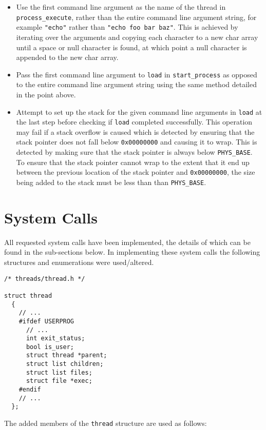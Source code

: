 \documentclass{article}
\begin{document}
\begin{itemize}
    \item Use the first command line argument as the name of the thread in \verb!process_execute!, rather than the entire command line argument string, for example \verb!"echo"! rather than \verb!"echo foo bar baz"!. This is achieved by iterating over the arguments and copying each character to a new char array until a space or null character is found, at which point a null character is appended to the new char array.

    \item Pass the first command line argument to \verb!load! in \verb!start_process! as opposed to the entire command line argument string using the same method detailed in the point above.

    \item Attempt to set up the stack for the given command line arguments in \verb!load! at the last step before checking if \verb!load! completed successfully. This operation may fail if a stack overflow is caused which is detected by ensuring that the stack pointer does not fall below \verb!0x00000000! and causing it to wrap. This is detected by making sure that the stack pointer is always below \verb!PHYS_BASE!. To ensure that the stack pointer cannot wrap to the extent that it end up between the previous location of the stack pointer and \verb!0x00000000!, the size being added to the stack must be less than than \verb!PHYS_BASE!.
\end{itemize}

\section{System Calls}
\label{sec:system-calls}

All requested system calls have been implemented, the details of which can be found in the sub-sections below. In implementing these system calls the following structures and enumerations were used/altered.

\begin{verbatim}
/* threads/thread.h */

struct thread
  {
    // ...
    #ifdef USERPROG
      // ...
      int exit_status;
      bool is_user;
      struct thread *parent;
      struct list children;
      struct list files;
      struct file *exec;
    #endif
    // ...
  };
\end{verbatim}

The added members of the \verb!thread! structure are used as follows:
\end{document}
